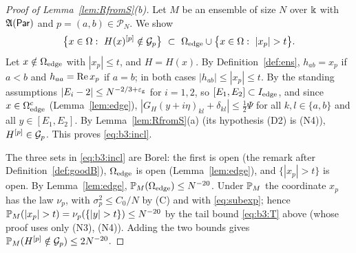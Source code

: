 \begin{proof}[Proof of Lemma~\ref{lem:RfromS}\textup{(b)}]
Let $M$ be an ensemble of size $N$ over $\K$ with $\fA(\Par)$ and $p=(a,b)\in\mathcal P_N$. We show
\begin{equation}\label{eq:b3:incl}
\big\{x\in\Omega:\ H(x)^{[p]}\notin\cG_p\big\}\ \subset\ \Omega_{\rm edge}\cup\big\{x\in\Omega:\ |x_p|>t\big\}.
\end{equation}
Let $x\notin\Omega_{\rm edge}$ with $|x_p|\le t$, and $H=H(x)$. By Definition~\ref{def:ens}, $h_{ab}=x_p$ if $a<b$ and $h_{aa}=\re x_p$ if $a=b$; in both cases $|h_{ab}|\le|x_p|\le t$.
By the standing assumptions $|E_i-2|\le N^{-2/3+\eg}$ for $i=1,2$, so $[E_1,E_2]\subset I_{\rm edge}$, and since $x\in\Omega^c_{\rm edge}$ (Lemma~\ref{lem:edge}),
$|G_H(y+i\eta)_{kl}+\delta_{kl}|\le\frac12\Psi$ for all $k,l\in\{a,b\}$ and all $y\in[E_1,E_2]$. By Lemma~\ref{lem:RfromS}(a) (its hypothesis \textup{(D2)} is \textup{(N4)}),
$H^{[p]}\in\cG_p$. This proves \eqref{eq:b3:incl}.

The three sets in \eqref{eq:b3:incl} are Borel: the first is open (the remark after Definition~\ref{def:goodB}), $\Omega_{\rm edge}$ is open (Lemma~\ref{lem:edge}), and
$\{|x_p|>t\}$ is open. By Lemma~\ref{lem:edge}, $\P_M(\Omega_{\rm edge})\le N^{-20}$. Under $\P_M$ the coordinate $x_p$ has the law $\nu_p$, with $\sigma_p^2\le C_0/N$ by (C)
and with \eqref{eq:subexp}; hence $\P_M(|x_p|>t)=\nu_p(\{|y|>t\})\le N^{-20}$ by the tail bound \eqref{eq:b3:T} above (whose proof uses only \textup{(N3)}, \textup{(N4)}).
Adding the two bounds gives $\P_M(H^{[p]}\notin\cG_p)\le2N^{-20}$.
\end{proof}

